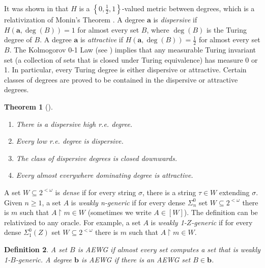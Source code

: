 \documentclass[10pt,a4paper]{amsart}
\newtheorem{theorem}{Theorem}
\newtheorem{definition}[theorem]{Definition}
\begin{document}
It was shown in {\cite{MR4741732}} that $H$ is a $\left\{ 0, \frac{1}{2}, 1 \right\}$-valued metric between degrees, which is a relativization of Monin's Theorem {\cite{MR3883780}}.
A degree $\mathbf{a}$ is {\emph{dispersive}}
if $H (\mathbf{a}, \deg (B)) = 1$ for almost every set $B$, where $\deg (B)$
is the Turing degree of $B$. A degree $\mathbf{a}$ is {\emph{attractive}} if
$H (\mathbf{a}, \deg (B)) = \frac{1}{2}$ for almost every set $B$. The
Kolmogorov 0-1 Law (see {\cite{MR2732288}}) implies that any measurable Turing
invariant set (a collection of sets that is closed under Turing equivalence)
has measure 0 or 1. In particular, every Turing degree is either dispersive or
attractive. Certain classes of degrees are proved to be contained in the
dispersive or attractive degrees.

\begin{theorem}[{\cite{MR4741732}}]
  \label{1}
  \begin{enumerate}
  
      \item There is a dispersive high r.e. degree.
      \item Every low r.e. degree is dispersive.
      \item The class of dispersive degrees is closed downwards.
      \item Every almost everywhere dominating degree is attractive.
  \end{enumerate}
\end{theorem}

A set $W \subseteq 2^{< \omega}$ is {\emph{dense}} if for every string
$\sigma$, there is a string $\tau \in W$ extending $\sigma$. Given $n \geq 1$,
a set $A$ is {\emph{weakly n-generic}} if for every dense $\Sigma^0_n$ set $W
\subseteq 2^{< \omega}$ there is $m$ such that $A \upharpoonright m \in W$
(sometimes we write $A \in [W]$). The definition can be relativized to any
oracle. For example, a set $A$ is {\emph{weakly 1-$Z$-generic}} if for
every dense $\Sigma^{0}_1(Z)$ set $W \subseteq 2^{< \omega}$ there is $m$ such
that $A \upharpoonright m \in W$.

\begin{definition}
  A set $B$ is {\emph{AEWG}} if almost every set computes a set
  that is weakly 1-$B$-generic. A degree $\mathbf{b}$ is AEWG if there is an AEWG
  set $B \in\mathbf{b}$.
\end{definition}
\end{document}
